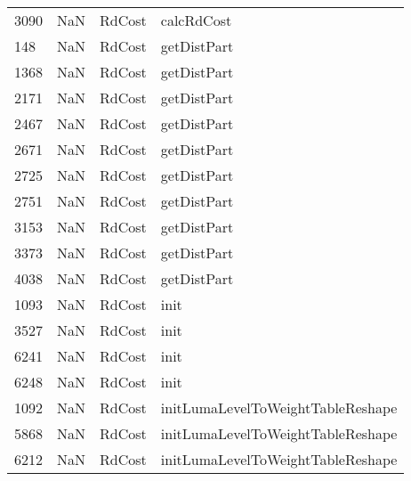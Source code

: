 \begin{tabular}{llll}
3090 &                   NaN &                     RdCost &                                calcRdCost \\
148  &                   NaN &                     RdCost &                               getDistPart \\
1368 &                   NaN &                     RdCost &                               getDistPart \\
2171 &                   NaN &                     RdCost &                               getDistPart \\
2467 &                   NaN &                     RdCost &                               getDistPart \\
2671 &                   NaN &                     RdCost &                               getDistPart \\
2725 &                   NaN &                     RdCost &                               getDistPart \\
2751 &                   NaN &                     RdCost &                               getDistPart \\
3153 &                   NaN &                     RdCost &                               getDistPart \\
3373 &                   NaN &                     RdCost &                               getDistPart \\
4038 &                   NaN &                     RdCost &                               getDistPart \\
1093 &                   NaN &                     RdCost &                                      init \\
3527 &                   NaN &                     RdCost &                                      init \\
6241 &                   NaN &                     RdCost &                                      init \\
6248 &                   NaN &                     RdCost &                                      init \\
1092 &                   NaN &                     RdCost &         initLumaLevelToWeightTableReshape \\
5868 &                   NaN &                     RdCost &         initLumaLevelToWeightTableReshape \\
6212 &                   NaN &                     RdCost &         initLumaLevelToWeightTableReshape \\

\end{tabular}
